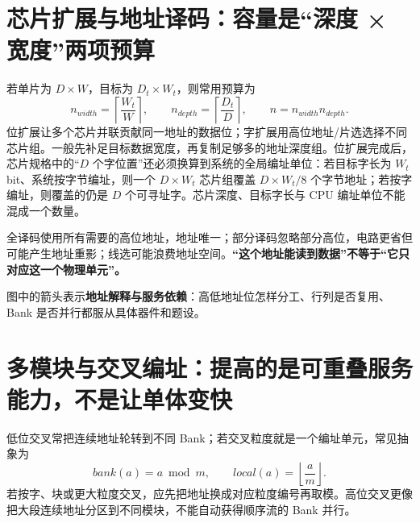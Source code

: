 \documentclass[UTF8,fontset=fandol,11pt,a4paper]{ctexart}
\newcommand{\kw}[1]{\textbf{\color{deep}#1}}\newcommand{\code}[1]{\texttt{#1}}
\begin{document}
\section{芯片扩展与地址译码：容量是“深度 × 宽度”两项预算}
若单片为 $D\times W$，目标为 $D_t\times W_t$，则常用预算为
\[
n_{width}=\left\lceil\frac{W_t}{W}\right\rceil,
\qquad
n_{depth}=\left\lceil\frac{D_t}{D}\right\rceil,
\qquad
n=n_{width}n_{depth}.
\]
位扩展让多个芯片并联贡献同一地址的数据位；字扩展用高位地址/片选选择不同芯片组。一般先补足目标数据宽度，再复制足够多的地址深度组。位扩展完成后，芯片规格中的“$D$ 个字位置”还必须换算到系统的全局编址单位：若目标字长为 $W_t$ bit、系统按字节编址，则一个 $D\times W_t$ 芯片组覆盖 $D\times W_t/8$ 个字节地址；若按字编址，则覆盖的仍是 $D$ 个可寻址字。芯片深度、目标字长与 CPU 编址单位不能混成一个数量。

全译码使用所有需要的高位地址，地址唯一；部分译码忽略部分高位，电路更省但可能产生地址重影；线选可能浪费地址空间。\kw{“这个地址能读到数据”不等于“它只对应这一个物理单元”。}

\begin{center}

\end{center}

\begin{center}
\end{center}
图中的箭头表示\textbf{地址解释与服务依赖}：高低地址位怎样分工、行列是否复用、Bank 是否并行都服从具体器件和题设。

\section{多模块与交叉编址：提高的是可重叠服务能力，不是让单体变快}
低位交叉常把连续地址轮转到不同 Bank；若交叉粒度就是一个编址单元，常见抽象为
\[
bank(a)=a\bmod m,
\qquad
local(a)=\left\lfloor\frac{a}{m}\right\rfloor.
\]
若按字、块或更大粒度交叉，应先把地址换成对应粒度编号再取模。高位交叉更像把大段连续地址分区到不同模块，不能自动获得顺序流的 Bank 并行。
\end{document}
